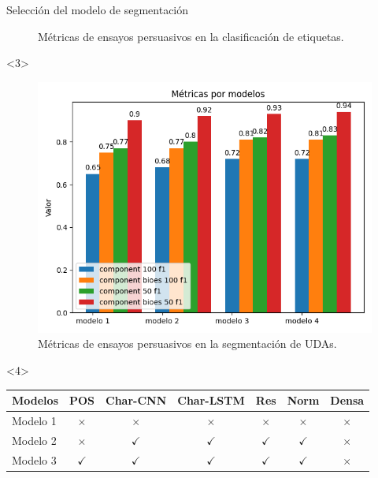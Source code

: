 \documentclass{beamer}
\begin{document}
\begin{frame}{Selección del modelo de segmentación}
\begin{onlyenv}
\begin{figure}
            \caption{Métricas de ensayos persuasivos en la clasificación de etiquetas.}
        \end{figure}
    \end{onlyenv}
    \begin{onlyenv}<3>
        \begin{figure}
            \includegraphics[scale=0.6]{Graphics/persuasive_essays_all_linked_components.png}
            \caption{Métricas de ensayos persuasivos en la segmentación de UDAs.}
        \end{figure}
    \end{onlyenv}
    \begin{onlyenv}<4>
        \begin{table}
            \begin{center}
                \begin{tabular}{|l|c|c|c|c|c|c|} \hline
                Modelos 		& POS       & Char-CNN  & Char-LSTM & Res       & Norm      & Densa  \\ \hline
                Modelo 1		& $\times$	& $\times$    & $\times$    & $\times$	& $\times$    & $\times$ \\ \hline
                Modelo 2		& $\times$	& $\checkmark$    & $\checkmark$    & $\checkmark$	& $\checkmark$    & $\times$ \\ \hline
                Modelo 3		& $\checkmark$	& $\checkmark$    & $\checkmark$    & $\checkmark$	& $\checkmark$    & $\times$ \\ \hline

\end{tabular}
\end{center}
\end{table}
\end{onlyenv}
\end{frame}
\end{document}
